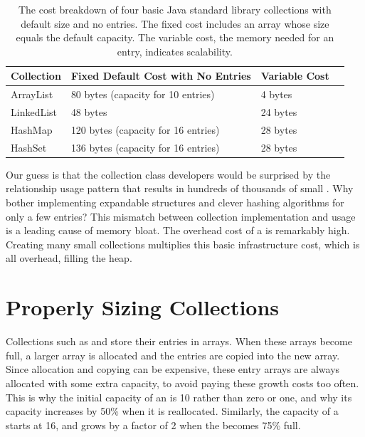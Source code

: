 \begin{table}
  \centering
 \begin{tabular}{llll} \toprule
 	 Collection & Fixed Default Cost with No Entries & Variable Cost  \\ \midrule
 	ArrayList & 80 bytes (capacity for 10 entries) & 4 bytes  \\
 	LinkedList & 48 bytes & 24 bytes  \\
 	HashMap & 120 bytes (capacity for 16 entries) & 28 bytes  \\
 	HashSet & 136 bytes (capacity for 16 entries) & 28 bytes &  \\
 	\bottomrule
 \end{tabular}
  \caption{The cost breakdown of four basic Java standard library collections
  with default size and no entries. The fixed cost includes an array whose
   size equals the default capacity. The variable cost, the memory needed for
   an entry, indicates scalability.}
  \label{tab:collection-costs}
\end{table}

Our guess is that the
collection class developers would be surprised by the relationship usage pattern
that results in hundreds of thousands of small . Why bother
implementing expandable structures and clever hashing algorithms for only a few entries?
This mismatch between collection implementation and usage is 
a leading cause of memory bloat. The overhead cost of a  is
remarkably high. Creating many small collections multiplies this basic infrastructure
cost, which is all overhead, filling the heap. 
 

\section{Properly Sizing Collections}
\label{sec:proper-size}

Collections such as  and  store their entries in
arrays. When these arrays become full, a larger array is allocated
and the entries are copied into the new array.  Since allocation and copying
can be expensive, these entry arrays are always allocated with some extra
capacity, to avoid paying these growth costs too often. 
This is why the initial capacity of an  is 10 rather than zero
 or one, and why its capacity increases by
50\% when it is reallocated. 
Similarly, the capacity of a  starts at 16, and grows by a
factor of 2 when the  becomes 75\% full. 

